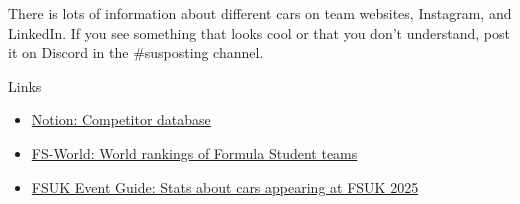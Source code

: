 \begin{frame}
    There is lots of information about different cars
    on team websites, Instagram, and LinkedIn.
    If you see something that looks cool or that you don't understand,
    post it on Discord in the \#susposting channel. \\
    \vspace*{2ex}
    \begin{block}{Links}
        \begin{itemize}
            \item \href{https://meadow-dime-6f1.notion.site/Competitors-277361df626980e2a44bded1ef8a6a63}{Notion: Competitor database}
            \item \href{https://fs-world.org/E/308/}{FS-World: World rankings of Formula Student teams}
            \item \href{https://issuu.com/imeche/docs/formula_student_2025_event_guide}{FSUK Event Guide: Stats about cars appearing at FSUK 2025}
        \end{itemize}
    \end{block}
\end{frame}
